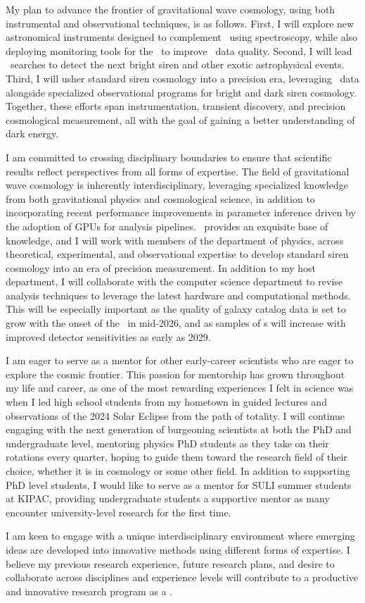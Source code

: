 My plan to advance the frontier of gravitational wave cosmology, using both instrumental and observational techniques, is as follows. 
First, 
I will explore new astronomical instruments designed to complement \Rubin\ using spectroscopy, 
while also deploying monitoring tools for the \LSSTCam\ to improve \LSST\ data quality. 
Second, I will lead \ToO\ searches to detect the next bright siren and other exotic astrophysical events. 
Third, I will usher standard siren cosmology into a precision era, leveraging \LSST\ data alongside specialized observational programs for bright and dark siren cosmology. 
Together, these efforts span instrumentation, transient discovery, and precision cosmological measurement, all with the goal of gaining a better understanding of dark energy.

I am committed to crossing disciplinary boundaries to ensure that scientific results reflect perspectives from all forms of expertise. The field of gravitational wave cosmology is inherently interdisciplinary, leveraging specialized knowledge from both gravitational physics and cosmological science, in addition to incorporating recent performance improvements in parameter inference driven by the adoption of GPUs for analysis pipelines. \Institute\ provides an exquisite base of knowledge, and I will work with members of the department of physics, across theoretical, experimental, and observational expertise to develop standard siren cosmology into an era of precision measurement. In addition to my host department, I will collaborate with the computer science department to revise analysis techniques to leverage the latest hardware and computational methods. This will be especially important as the quality of galaxy catalog data is set to grow with the onset of the \LSST\ in mid-2026, and as samples of \GW s will increase with improved detector sensitivities as early as 2029.

I am eager to serve as a mentor for other early-career scientists who are eager to explore the cosmic frontier. This passion for mentorship has grown throughout my life and career, as one of the most rewarding experiences I felt in science was when I led high school students from my hometown in guided lectures and observations of the 2024 Solar Eclipse from the path of totality. I will continue engaging with the next generation of burgeoning scientists at both the PhD and undergraduate level, mentoring  physics PhD students as they take on their rotations every quarter, hoping to guide them toward the research field of their choice, whether it is in cosmology or some other field. In addition to supporting PhD level students, I would like to serve as a mentor for SULI summer students at KIPAC, providing undergraduate students a supportive mentor as many encounter university-level research for the first time.

I am keen to engage with a unique interdisciplinary environment where emerging ideas are developed into innovative methods using different forms of expertise. I believe my previous research experience, future research plans, and desire to collaborate across disciplines and experience levels will contribute to a productive and innovative research program as a \Position. 